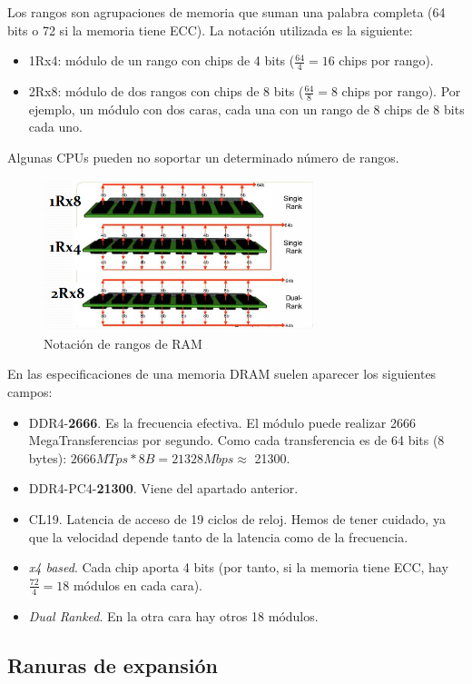 \documentclass[12pt,spanish]{article}
\begin{document}
Los rangos son agrupaciones de memoria que suman una palabra completa (64 bits o 72 si la memoria tiene ECC). La notación utilizada es la siguiente:
\begin{itemize}
	\item 1Rx4: módulo de un rango con chips de 4 bits ($\frac{64}{4}= 16$ chips por rango).
	\item 2Rx8: módulo de dos rangos con chips de 8 bits ($\frac{64}{8}= 8$ chips por rango). Por ejemplo, un módulo con dos caras, cada una con un rango de 8 chips de 8 bits cada uno.
\end{itemize}

Algunas CPUs pueden no soportar un determinado número de rangos.

\begin{figure}[H]
	\centering
	\includegraphics[width=0.7\textwidth]{ramranks.png}
	\caption{Notación de rangos de RAM}
\end{figure}

En las especificaciones de una memoria DRAM suelen aparecer los siguientes campos:
\begin{itemize}
	\item DDR4-\textbf{2666}. Es la frecuencia efectiva. El módulo puede realizar 2666 MegaTransferencias por segundo. Como cada transferencia es de 64 bits (8 bytes): $2666 MTps * 8 B= 21328Mbps \approx$ 21300.
	\item DDR4-PC4-\textbf{21300}. Viene del apartado anterior.
	\item CL19. Latencia de acceso de 19 ciclos de reloj. Hemos de tener cuidado, ya que la velocidad depende tanto de la latencia como de la frecuencia.
	\item \textit{x4 based}. Cada chip aporta 4 bits (por tanto, si la memoria tiene ECC, hay $\frac{72}{4}=18$ módulos en cada cara).
	\item \textit{Dual Ranked}. En la otra cara hay otros 18 módulos.
\end{itemize}

\subsection{Ranuras de expansión}
\end{document}
